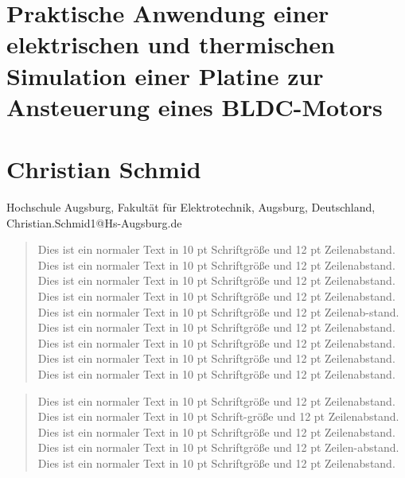 \documentclass[10pt,a4paper,oneside,abstracton]{scrartcl}
\begin{document}
\section*{Praktische Anwendung einer elektrischen und thermischen Simulation einer Platine zur Ansteuerung eines BLDC-Motors}
\section*{Christian Schmid}
Hochschule Augsburg, Fakultät für Elektrotechnik, Augsburg, Deutschland, Christian.Schmid1@Hs-Augsburg.de 


\begin{abstract} %
\noindent %
Dies ist ein normaler Text in 10 pt Schriftgröße und 12 pt Zeilenabstand. Dies ist ein normaler Text in 10 pt Schriftgröße und 12 pt Zeilenabstand. Dies ist ein normaler Text in 10 pt Schriftgröße und 12 pt Zeilenabstand. Dies ist ein normaler Text in 10 pt Schriftgröße und 12 pt Zeilenabstand. Dies ist ein normaler Text in 10 pt Schriftgröße und 12 pt Zeilenab-stand. Dies ist ein normaler Text in 10 pt Schriftgröße und 12 pt Zeilenabstand. Dies ist ein normaler Text in 10 pt Schriftgröße und 12 pt Zeilenabstand. Dies ist ein normaler Text in 10 pt Schriftgröße und 12 pt Zeilenabstand. Dies ist ein normaler Text in 10 pt Schriftgröße und 12 pt Zeilenabstand.
\end{abstract}

\renewcommand{\abstractname}{Abstract} %

\begin{abstract}
\noindent %
Dies ist ein normaler Text in 10 pt Schriftgröße und 12 pt Zeilenabstand. Dies ist ein normaler Text in 10 pt Schrift-größe und 12 pt Zeilenabstand. Dies ist ein normaler Text in 10 pt Schriftgröße und 12 pt Zeilenabstand. Dies ist ein normaler Text in 10 pt Schriftgröße und 12 pt Zeilen-abstand. Dies ist ein normaler Text in 10 pt Schriftgröße und 12 pt Zeilenabstand.
\end{abstract}
\end{document}
